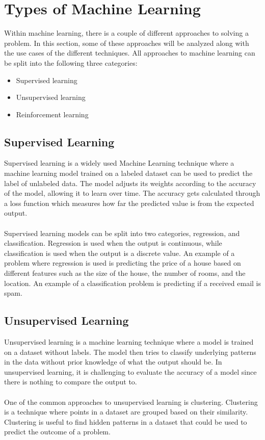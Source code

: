 \section{Types of Machine Learning}\label{sec:ml-types}
Within machine learning, there is a couple of different approaches to solving a problem. In this section, some of these
approaches will be analyzed along with the use cases of the different techniques. All approaches to machine learning can
be split into the following three categories:
\begin{itemize}
    \item Supervised learning
    \item Unsupervised learning
    \item Reinforcement learning
\end{itemize}


\subsection{Supervised Learning}\label{sec:supervised-learning}
Supervised learning is a widely used Machine Learning technique where a machine learning model trained 
on a labeled dataset can be used to predict the label of unlabeled data. The model adjusts its weights 
according to the accuracy of the model, allowing it to learn over time. The accuracy gets calculated through
a loss function which measures how far the predicted value is from the expected output. \cite{ml_supervised_learning}
\\\\
Supervised learning models can be split into two categories, regression, and classification. Regression is used when
the output is continuous, while classification is used when the output is a discrete value. An example of a problem
where regression is used is predicting the price of a house based on different features such as the size of the house,
the number of rooms, and the location. An example of a classification problem is predicting if a received email is spam. \cite{ml_reg_vs_class}


\subsection{Unsupervised Learning}\label{sec:unsupervised-learning}
Unsupervised learning is a machine learning technique where a model is trained on a dataset without labels. The model then
tries to classify underlying patterns in the data without prior knowledge of what the output should be. In unsupervised learning,
it is challenging to evaluate the accuracy of a model since there is nothing to compare the output to. \cite{ml_unsupervised_learning}
\\\\
One of the common approaches to unsupervised learning is clustering. Clustering is a technique where points in a dataset are grouped 
based on their similarity. Clustering is useful to find hidden patterns in a dataset that could be used to predict the outcome
of a problem. \cite{ml_unsupervised_learning}


